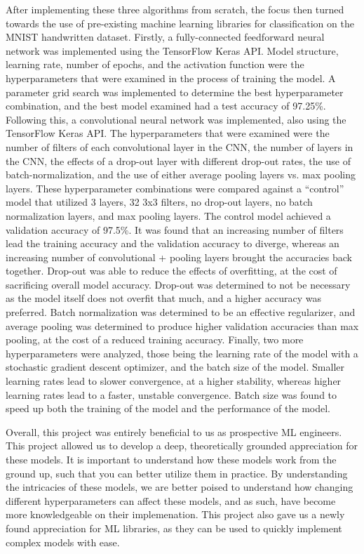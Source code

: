 \documentclass[a4paper]{article}
\begin{document}
After implementing these three algorithms from scratch, the focus then turned towards the use of pre-existing machine learning libraries for classification on the MNIST handwritten dataset. Firstly, a fully-connected feedforward neural network was implemented using the TensorFlow Keras API. Model structure, learning rate, number of epochs, and the activation function were the hyperparameters that were examined in the process of training the model. A parameter grid search was implemented to determine the best hyperparameter combination, and the best model examined had a test accuracy of 97.25\%. Following this, a convolutional neural network was implemented, also using the TensorFlow Keras API. The hyperparameters that were examined were the number of filters of each convolutional layer in the CNN, the number of layers in the CNN, the effects of a drop-out layer with different drop-out rates, the use of batch-normalization, and the use of either average pooling layers vs. max pooling layers. These hyperparameter combinations were compared against a ``control'' model that utilized 3 layers, 32 3x3 filters, no drop-out layers, no batch normalization layers, and max pooling layers. The control model achieved a validation accuracy of 97.5\%. It was found that an increasing number of filters lead the training accuracy and the validation accuracy to diverge, whereas an increasing number of convolutional + pooling layers brought the accuracies back together. Drop-out was able to reduce the effects of overfitting, at the cost of sacrificing overall model accuracy. Drop-out was determined to not be necessary as the model itself does not overfit that much, and a higher accuracy was preferred. Batch normalization was determined to be an effective regularizer, and average pooling was determined to produce higher validation accuracies than max pooling, at the cost of a reduced training accuracy. Finally, two more hyperparameters were analyzed, those being the learning rate of the model with a stochastic gradient descent optimizer, and the batch size of the model. Smaller learning rates lead to slower convergence, at a higher stability, whereas higher learning rates lead to a faster, unstable convergence. Batch size was found to speed up both the training of the model and the performance of the model.

Overall, this project was entirely beneficial to us as prospective ML engineers. This project allowed us to develop a deep, theoretically grounded appreciation for these models. It is important to understand how these models work from the ground up, such that you can better utilize them in practice. By understanding the intricacies of these models, we are better poised to understand how changing different hyperparameters can affect these models, and as such, have become more knowledgeable on their implemenation. This project also gave us a newly found appreciation for ML libraries, as they can be used to quickly implement complex models with ease. 
\end{document}
